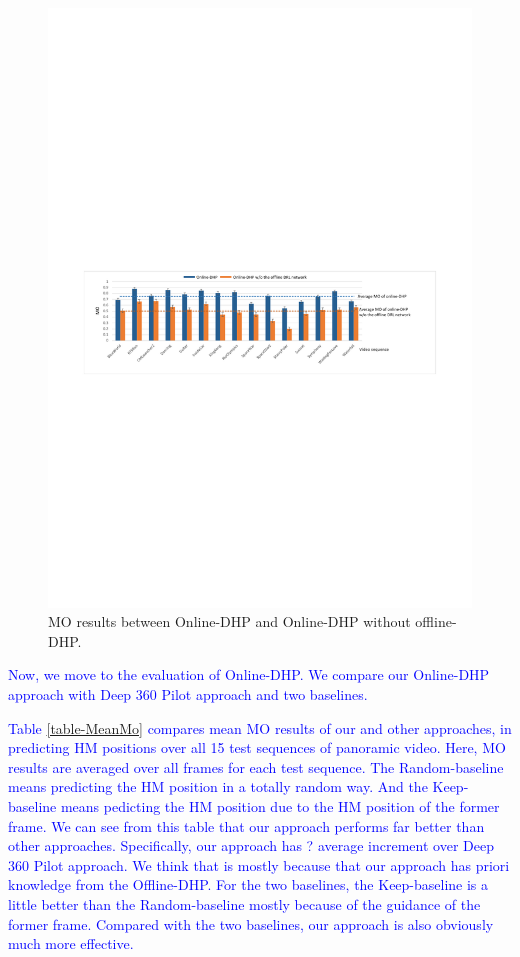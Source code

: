 \documentclass[10pt,journal,compsoc]{IEEEtran}
\begin{document}
\begin{figure}
	\begin{center}
		\centerline{\includegraphics[width=2\columnwidth]{figures/experiment_on_line/Mean_MO}}%
		\caption{\footnotesize{MO results between Online-DHP and Online-DHP without offline-DHP.}}
		\label{Online_compare}
	\end{center}
\end{figure}

\textcolor{blue}{Now, we move to the evaluation of Online-DHP. We compare our Online-DHP approach with Deep 360 Pilot approach\cite{hu2017deep} and two baselines.}

\textcolor{blue}{Table \ref{table-MeanMo} compares mean MO results of our and other approaches, in predicting HM positions over all 15 test sequences of panoramic video.
Here, MO results are averaged over all frames for each test sequence.
The Random-baseline means predicting the HM position in a totally random way.
And the Keep-baseline means pedicting the HM position due to the HM position of the former frame.
We can see from this table that our approach performs far better than other approaches. Specifically, our approach has ? average increment over Deep 360 Pilot approach\cite{hu2017deep}.
We think that is mostly because that our approach has priori knowledge from the Offline-DHP.
For the two baselines, the Keep-baseline is a little better than the Random-baseline mostly because of the guidance of the former frame.
Compared with the two baselines, our approach is also obviously much more effective.}
\end{document}
